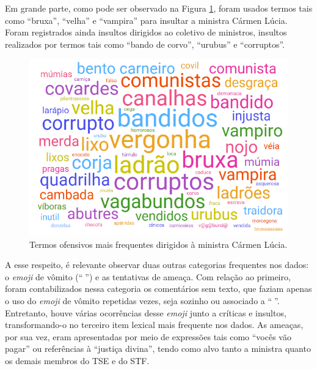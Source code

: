 \documentclass[portuguese]{textolivre}
\begin{document}
Em grande parte, como pode ser observado na Figura \ref{fig-3}, foram usados termos tais como ``bruxa'', ``velha'' e ``vampira'' para insultar a ministra Cármen Lúcia. Foram registrados ainda insultos dirigidos ao coletivo de ministros, insultos realizados por termos tais como ``bando de corvo'', ``urubus'' e ``corruptos''.

\begin{figure}[h!]
\centering
\begin{minipage}{.60\textwidth}
\includegraphics[width=\textwidth ]{Fig8.png}
\caption{Termos ofensivos mais frequentes dirigidos à ministra Cármen Lúcia.}
\label{fig-3}
\end{minipage}
\end{figure}

A esse respeito, é relevante observar duas outras categorias frequentes nos dados: o \textit{emoji} de vômito (``{\Symbola 🤮}'') e as tentativas de ameaça. Com relação ao primeiro, foram contabilizados nessa categoria os comentários sem texto, que faziam apenas o uso do \textit{emoji} de vômito repetidas vezes, seja sozinho ou associado a ``{\Symbola 🤢}''. Entretanto, houve várias ocorrências desse \textit{emoji} junto a críticas e insultos, transformando-o no terceiro item lexical mais frequente nos dados. As ameaças, por sua vez, eram apresentadas por meio de expressões tais como ``vocês vão pagar'' ou referências à ``justiça divina'', tendo como alvo tanto a ministra quanto os demais membros do TSE e do STF.
\end{document}
